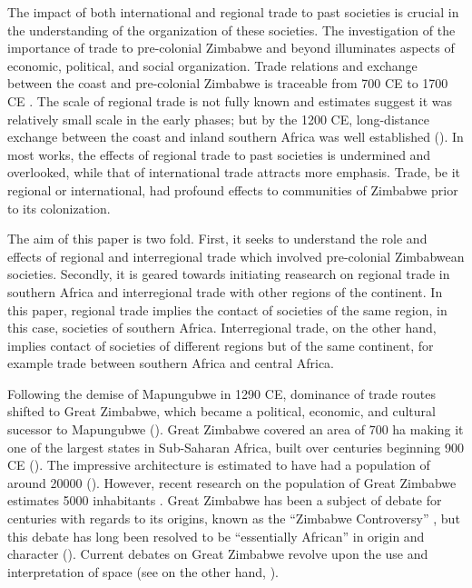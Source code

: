 The impact of both international and regional trade to past societies is crucial in the understanding of the organization of these societies. The investigation of the importance of trade to pre-colonial Zimbabwe and beyond illuminates aspects of economic, political, and social organization. Trade relations and exchange between the coast and pre-colonial Zimbabwe is traceable from 700 CE to 1700 CE \parencite{pwiti2005}. The scale of regional trade is not fully known and estimates suggest it was relatively small scale in the early phases; but by the 1200 CE,  long-distance exchange between the coast and inland southern Africa was well established (\cites{pwiti1991}{pwiti2005}{chiripanhura2017}). In most works, the effects of regional trade to past societies is undermined and overlooked, while that of international trade attracts more emphasis. Trade, be it regional or international, had profound effects to communities of Zimbabwe prior to its colonization.

The aim of this paper is two fold. First, it seeks to understand the role and effects of regional and interregional trade which involved pre-colonial Zimbabwean societies. Secondly, it is geared towards initiating reasearch on regional trade in southern Africa and interregional trade with other regions of the continent. In this paper, regional trade implies the contact of societies of the same region, in this case, societies of southern Africa. Interregional trade, on the other hand, implies contact of societies of different regions but of the same continent, for example trade between southern Africa and central Africa.


Following the demise of Mapungubwe in 1290 CE, dominance of trade routes shifted to Great Zimbabwe, which became a political, economic, and cultural sucessor to Mapungubwe (\cites{pikirayi1993}{pwiti2005}{manyanga2006}). Great Zimbabwe covered an area of 700 ha making it one of the largest states in Sub-Saharan Africa, built over centuries beginning 900 CE (\cites{sinclair1993}{ndoro1997}{ndoro2001}).
The impressive architecture is estimated to have had a population of around \num{20000} (\cites{garlake1973}{hall1990}{kim2008}). However, recent research on the population of Great Zimbabwe estimates 5000 inhabitants \parencite{chirikure2017}.
Great Zimbabwe has been a subject of debate for centuries with regards to its origins, known as the \enquote{Zimbabwe Controversy} \parencite{tangri1990},
but this debate has long been resolved to be \enquote{essentially African} in origin and character (\cites{randall1906}{ndoro1997}). Current debates on Great Zimbabwe revolve upon the use and interpretation of space
(see \cites{huffman1984a}{huffman1984b}{huffman1996}{huffman2010}{huffman2014}
on the other hand, \cites{beach1998}{chirikure2008}{pikirayi2011}{chirikure2013socio}).

